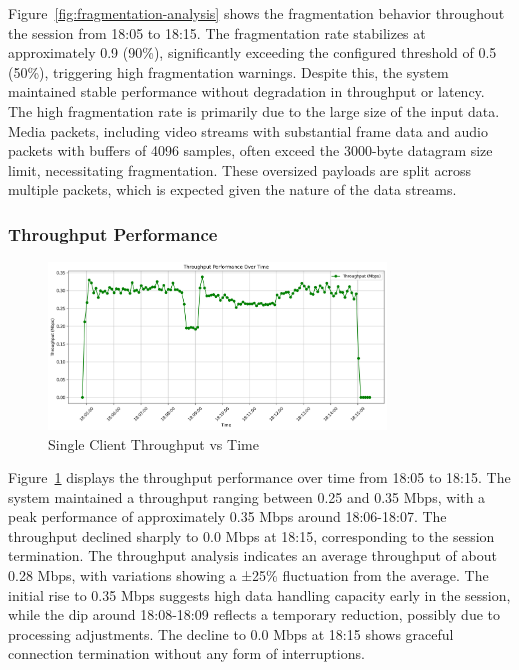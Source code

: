 Figure~\ref{fig:fragmentation-analysis} shows the fragmentation behavior throughout the session from 18:05 to 18:15. The fragmentation rate stabilizes at approximately 0.9 (90\%), significantly exceeding the configured threshold of 0.5 (50\%), triggering high fragmentation warnings. Despite this, the system maintained stable performance without degradation in throughput or latency.
The high fragmentation rate is primarily due to the large size of the input data. Media packets, including video streams with substantial frame data and audio packets with buffers of 4096 samples, often exceed the 3000-byte datagram size limit, necessitating fragmentation. These oversized payloads are split across multiple packets, which is expected given the nature of the data streams.



\subsubsection{Throughput Performance}

\begin{figure}[h!]
\centering
\includegraphics[width=0.8\textwidth]{Evaluation/single_throughput_performance.png}
\caption{Single Client Throughput vs Time}
\label{fig:single-throughput-performance}
\end{figure}

Figure~\ref{fig:single-throughput-performance} displays the throughput performance over time from 18:05 to 18:15. The system maintained a throughput ranging between 0.25 and 0.35 Mbps, with a peak performance of approximately 0.35 Mbps around 18:06-18:07. The throughput declined sharply to 0.0 Mbps at 18:15, corresponding to the session termination.
The throughput analysis indicates an average throughput of about 0.28 Mbps, with variations showing a ±25\% fluctuation from the average. The initial rise to 0.35 Mbps suggests high data handling capacity early in the session, while the dip around 18:08-18:09 reflects a temporary reduction, possibly due to processing adjustments. The decline to 0.0 Mbps at 18:15 shows graceful connection termination without any form of interruptions.


